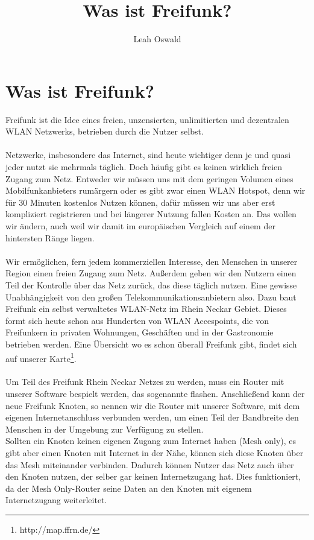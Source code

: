 \documentclass[10pt,a4paper]{article}
\author{Leah Oswald}
\title{Was ist Freifunk?}
\begin{document}

\section*{Was ist Freifunk?}

Freifunk ist die Idee eines freien, unzensierten, unlimitierten und dezentralen WLAN Netzwerks, betrieben
durch die Nutzer selbst.
\\\\
Netzwerke, insbesondere das Internet, sind heute wichtiger denn je und quasi jeder nutzt sie mehrmals
täglich. Doch häufig gibt es keinen wirklich freien Zugang zum Netz. Entweder wir müssen uns mit dem geringen
Volumen eines Mobilfunkanbieters rumärgern oder es gibt zwar einen WLAN Hotspot, denn wir für 30 Minuten kostenlos
Nutzen können, dafür müssen wir uns aber erst kompliziert registrieren und bei längerer Nutzung fallen Kosten an.
Das wollen wir ändern, auch weil wir damit im europäischen Vergleich auf einem der hintersten Ränge liegen.
\\\\
Wir ermöglichen, fern jedem kommerziellen Interesse, den Menschen in unserer Region einen freien Zugang zum Netz. Außerdem
geben wir den Nutzern einen Teil der Kontrolle über das Netz zurück, das diese täglich nutzen. Eine gewisse Unabhängigkeit
von den großen Telekommunikationsanbietern also. Dazu baut Freifunk ein selbst verwaltetes WLAN-Netz im Rhein Neckar Gebiet.
Dieses formt sich heute schon aus Hunderten von WLAN Accespoints, die von Freifunkern in privaten Wohnungen, Geschäften 
und in der Gastronomie betrieben werden. Eine Übersicht wo es schon überall Freifunk gibt, findet sich auf unserer Karte\footnote{http://map.ffrn.de/}.
\\\\
Um Teil des Freifunk Rhein Neckar Netzes zu werden, muss ein Router mit unserer Software bespielt werden, das sogenannte \glqq flashen\grqq.
Anschließend kann der neue Freifunk Knoten, so nennen wir die Router mit unserer Software, mit dem eigenen Internetanschluss verbunden werden,
um einen Teil der Bandbreite den Menschen in der Umgebung zur Verfügung zu stellen.\\
Sollten ein Knoten keinen eigenen Zugang zum Internet haben (Mesh only), es gibt aber einen Knoten mit Internet in der Nähe, können sich diese Knoten über
das Mesh miteinander verbinden. Dadurch können Nutzer das Netz auch über den Knoten nutzen, der selber gar keinen Internetzugang hat. Dies funktioniert,
da der \glqq Mesh Only\grqq-Router seine Daten an den Knoten mit eigenem Internetzugang weiterleitet.
\end{document}
